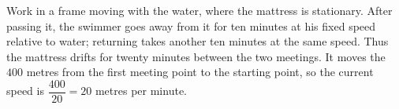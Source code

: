 Work in a frame moving with the water, where the mattress is stationary. After passing it, the swimmer goes away from it for ten minutes at his fixed speed relative to water; returning takes another ten minutes at the same speed. Thus the mattress drifts for twenty minutes between the two meetings. It moves the $400$ metres from the first meeting point to the starting point, so the current speed is $\dfrac{400}{20}=\boxed{20}$ metres per minute.
